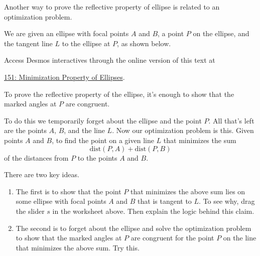 \documentclass{ximera}
\begin{document}
\begin{question}  \label{Q5445rggfbhyhyrdt}

Another way to prove the reflective property of ellipse is related to an optimization problem.

We are given an ellipse with focal points $A$ and $B$, a point $P$ on the ellipse, and the tangent line $L$ to the ellipse at $P$, as shown below.


\begin{onlineOnly}
    \begin{center}
\end{center}
\end{onlineOnly}

Access Desmos interactives through the online version of this text at
 
\href{https://www.desmos.com/calculator/ncyrefzwwg}{151: Minimization Property of Ellipses}.


To prove the reflective property of the ellipse, it's enough to show that the marked angles at $P$ are congruent.

To do this we temporarily forget about the ellipse and the point $P$. All that's left are the points $A$, $B$, and the line $L$. Now our optimization problem is this. Given points $A$ and $B$, to find the point on a given line $L$ that minimizes the sum 
\[
   \text{dist}(P,A) + \text{dist}(P,B)
\]
of the distances from $P$ to the points $A$ and $B$.

There are two key ideas.

\begin{enumerate}
\item The first is to show that the point $P$ that minimizes the above sum lies on some ellipse with focal points $A$ and $B$ that is tangent to $L$. To see why, drag the slider $s$ in the worksheet above. Then explain the logic behind this claim.

\item The second is to forget about the ellipse and solve the optimization problem to show that the marked angles at $P$ are congruent for the point $P$ on the line that minimizes the above sum. Try this.

\end{enumerate}


\end{question}
\end{document}
